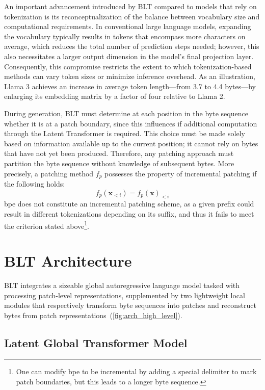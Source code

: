 An important advancement introduced by {\textsc BLT} compared to models that rely on tokenization is its reconceptualization of the balance between vocabulary size and computational requirements. In conventional large language models, expanding the vocabulary typically results in tokens that encompass more characters on average, which reduces the total number of prediction steps needed; however, this also necessitates a larger output dimension in the model's final projection layer. Consequently, this compromise restricts the extent to which tokenization-based methods can vary token sizes or minimize inference overhead. As an illustration, Llama 3 achieves an increase in average token length—from 3.7 to 4.4 bytes—by enlarging its embedding matrix by a factor of four relative to Llama 2.

During generation, {\textsc BLT} must determine at each position in the byte sequence whether it is at a patch boundary, since this influences if additional computation through the Latent Transformer is required. This choice must be made solely based on information available up to the current position; it cannot rely on bytes that have not yet been produced. Therefore, any patching approach must partition the byte sequence without knowledge of subsequent bytes. More precisely, a patching method $f_p$ possesses the property of incremental patching if the following holds:
$$f_p(\pmb{x}_{<i}) = f_p(\pmb{x})_{<i}$$
bpe does not constitute an incremental patching scheme, as a given prefix could result in different tokenizations depending on its suffix, and thus it fails to meet the criterion stated above\footnote{One can modify bpe to be incremental by adding a special delimiter to mark patch boundaries, but this leads to a longer byte sequence.}.

\section{{\textsc BLT} Architecture}
\label{section:architecture}
{\textsc BLT} integrates a sizeable global autoregressive language model tasked with processing patch-level representations, supplemented by two lightweight local modules that respectively transform byte sequences into patches and reconstruct bytes from patch representations~(\autoref{fig:arch_high_level}).

\subsection{Latent Global Transformer Model}

